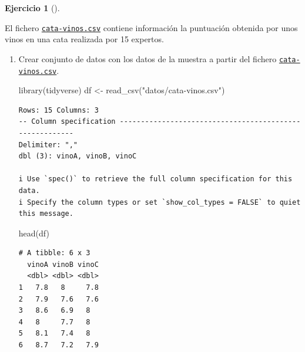 \documentclass[
  a4paper,
]{scrreport}
\newenvironment{Shaded}{\begin{snugshade}}{\end{snugshade}}
\newcommand{\FunctionTok}[1]{\textcolor[rgb]{0.28,0.35,0.67}{#1}}
\newcommand{\NormalTok}[1]{\textcolor[rgb]{0.00,0.23,0.31}{#1}}
\newcommand{\OtherTok}[1]{\textcolor[rgb]{0.00,0.23,0.31}{#1}}
\newcommand{\StringTok}[1]{\textcolor[rgb]{0.13,0.47,0.30}{#1}}
\theoremstyle{definition}
\newtheorem{exercise}{Ejercicio}[chapter]
\theoremstyle{remark}
\begin{document}
\begin{exercise}[]\protect\hypertarget{exr-anova-medidas-repetidas}{}\label{exr-anova-medidas-repetidas}

El fichero
\href{https://aprendeconalf.es/estadistica-practicas-r/datos/cata-vinos.csv}{\texttt{cata-vinos.csv}}
contiene información la puntuación obtenida por unos vinos en una cata
realizada por 15 expertos.

\begin{enumerate}
\def\labelenumi{\alph{enumi}.}
\item
  Crear conjunto de datos con los datos de la muestra a partir del
  fichero
  \href{https://aprendeconalf.es/estadistica-practicas-r/datos/cata-vinos.csv}{\texttt{cata-vinos.csv}}.

  \begin{tcolorbox}[enhanced jigsaw, breakable, toptitle=1mm, colbacktitle=quarto-callout-tip-color!10!white, rightrule=.15mm, opacityback=0, opacitybacktitle=0.6, titlerule=0mm, coltitle=black, colframe=quarto-callout-tip-color-frame, colback=white, bottomtitle=1mm, leftrule=.75mm, toprule=.15mm, title=\textcolor{quarto-callout-tip-color}{\faLightbulb}\hspace{0.5em}{Solución}, arc=.35mm, bottomrule=.15mm, left=2mm]

\begin{Shaded}
\begin{Highlighting}[]
\FunctionTok{library}\NormalTok{(tidyverse)}
\NormalTok{df }\OtherTok{\textless{}{-}} \FunctionTok{read\_csv}\NormalTok{(}\StringTok{"datos/cata{-}vinos.csv"}\NormalTok{)}
\end{Highlighting}
\end{Shaded}

\begin{verbatim}
Rows: 15 Columns: 3
-- Column specification --------------------------------------------------------
Delimiter: ","
dbl (3): vinoA, vinoB, vinoC

i Use `spec()` to retrieve the full column specification for this data.
i Specify the column types or set `show_col_types = FALSE` to quiet this message.
\end{verbatim}

\begin{Shaded}
\begin{Highlighting}[]
\FunctionTok{head}\NormalTok{(df)}
\end{Highlighting}
\end{Shaded}

\begin{verbatim}
# A tibble: 6 x 3
  vinoA vinoB vinoC
  <dbl> <dbl> <dbl>
1   7.8   8     7.8
2   7.9   7.6   7.6
3   8.6   6.9   8  
4   8     7.7   8  
5   8.1   7.4   8  
6   8.7   7.2   7.9
\end{verbatim}


\end{tcolorbox}
\end{enumerate}
\end{exercise}
\end{document}
